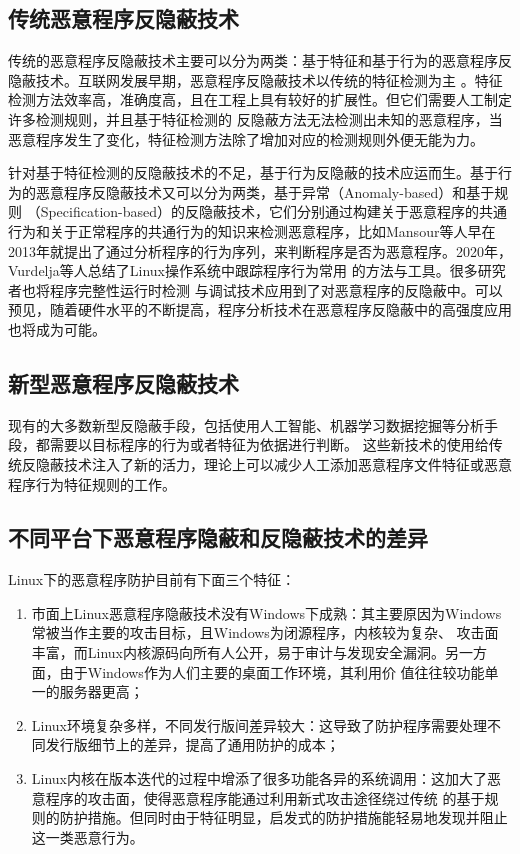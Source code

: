 \subsection{传统恶意程序反隐蔽技术}

传统的恶意程序反隐蔽技术主要可以分为两类：基于特征和基于行为的恶意程序反隐蔽技术。互联网发展早期，恶意程序反隐蔽技术以传统的特征检测为主
\cite{汪嘉来:977}。特征检测方法效率高，准确度高，且在工程上具有较好的扩展性。但它们需要人工制定许多检测规则，并且基于特征检测的
反隐蔽方法无法检测出未知的恶意程序，当恶意程序发生了变化，特征检测方法除了增加对应的检测规则外便无能为力\cite{Ye:2017}。

针对基于特征检测的反隐蔽技术的不足，基于行为反隐蔽的技术应运而生。基于行为的恶意程序反隐蔽技术又可以分为两类，基于异常（Anomaly-based）和基于规则
（Specification-based）的反隐蔽技术，它们分别通过构建关于恶意程序的共通行为和关于正常程序的共通行为的知识来检测恶意程序，比如Mansour等人早在
2013年就提出了通过分析程序的行为序列\cite{AHMADI201311}，来判断程序是否为恶意程序。2020年，Vurdelja等人总结了Linux操作系统中跟踪程序行为常用
的方法与工具\cite{vurdelja2020detection}。很多研究者也将程序完整性运行时检测\cite{LinuxTrustVeri}\cite{Duong2021DetectingMB}
与调试技术应用到了对恶意程序的反隐蔽中。可以预见，随着硬件水平的不断提高，程序分析技术在恶意程序反隐蔽中的高强度应用也将成为可能。

\subsection{新型恶意程序反隐蔽技术}

现有的大多数新型反隐蔽手段，包括使用人工智能、机器学习数据挖掘等分析手段，都需要以目标程序的行为或者特征为依据进行判断\cite{MalDetectReview}。
这些新技术的使用给传统反隐蔽技术注入了新的活力，理论上可以减少人工添加恶意程序文件特征或恶意程序行为特征规则的工作。

\subsection{不同平台下恶意程序隐蔽和反隐蔽技术的差异}

Linux下的恶意程序防护目前有下面三个特征：
\begin{enumerate}
\item 市面上Linux恶意程序隐蔽技术没有Windows下成熟：其主要原因为Windows常被当作主要的攻击目标，且Windows为闭源程序，内核较为复杂、
        攻击面丰富，而Linux内核源码向所有人公开，易于审计与发现安全漏洞。另一方面，由于Windows作为人们主要的桌面工作环境，其利用价
        值往往较功能单一的服务器更高；
\item Linux环境复杂多样，不同发行版间差异较大：这导致了防护程序需要处理不同发行版细节上的差异，提高了通用防护的成本；
\item Linux内核在版本迭代的过程中增添了很多功能各异的系统调用：这加大了恶意程序的攻击面，使得恶意程序能通过利用新式攻击途径绕过传统
        的基于规则的防护措施。但同时由于特征明显，启发式的防护措施能轻易地发现并阻止这一类恶意行为。
\end{enumerate}

